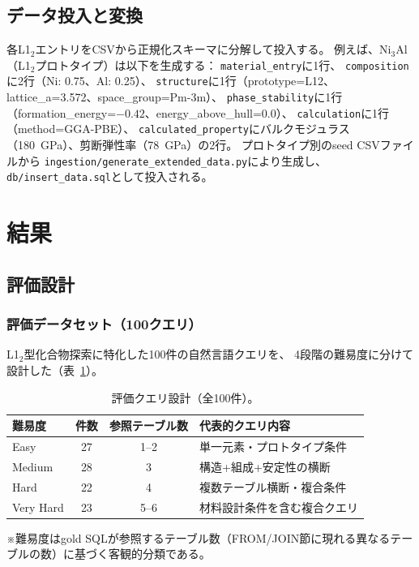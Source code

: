 \documentclass[5p,twocolumn]{elsarticle}
\begin{document}
\subsection{データ投入と変換}

各L1$_2$エントリをCSVから正規化スキーマに分解して投入する。
例えば、Ni$_3$Al（L1$_2$プロトタイプ）は以下を生成する：
\texttt{material\_entry}に1行、
\texttt{composition}に2行（Ni: 0.75、Al: 0.25）、
\texttt{structure}に1行（prototype=L12、lattice\_a=3.572、space\_group=Pm-3m）、
\texttt{phase\_stability}に1行（formation\_energy=$-0.42$、energy\_above\_hull=0.0）、
\texttt{calculation}に1行（method=GGA-PBE）、
\texttt{calculated\_property}にバルクモジュラス（180~GPa）、剪断弾性率（78~GPa）の2行。
プロトタイプ別のseed CSVファイルから
\texttt{ingestion/generate\_extended\_data.py}により生成し、\texttt{db/insert\_data.sql}として投入される。

\section{結果}
\label{sec:results}

\subsection{評価設計}

\subsubsection{評価データセット（100クエリ）}

L1$_2$型化合物探索に特化した100件の自然言語クエリを、
4段階の難易度に分けて設計した（表~\ref{tab:query_design}）。

\begin{table}[htbp]
  \centering
  \caption{評価クエリ設計（全100件）。}
  \label{tab:query_design}
  \small
  \begin{tabular}{lccl}
    \toprule
    難易度 & 件数 & 参照テーブル数 & 代表的クエリ内容 \\
    \midrule
    Easy & 27 & 1--2 & 単一元素・プロトタイプ条件 \\
    Medium & 28 & 3 & 構造+組成+安定性の横断 \\
    Hard & 22 & 4 & 複数テーブル横断・複合条件 \\
    Very Hard & 23 & 5--6 & 材料設計条件を含む複合クエリ \\
    \bottomrule
  \end{tabular}
  \vspace{2pt}
  \parbox{\linewidth}{\scriptsize
    ※難易度はgold SQLが参照するテーブル数（FROM/JOIN節に現れる異なるテーブルの数）に基づく客観的分類である。}
\end{table}
\end{document}
